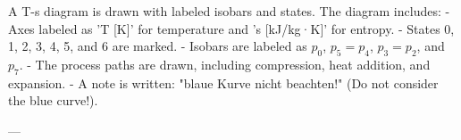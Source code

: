 A T-s diagram is drawn with labeled isobars and states. The diagram includes:  
- Axes labeled as 'T [K]' for temperature and 's [kJ/kg·K]' for entropy.  
- States 0, 1, 2, 3, 4, 5, and 6 are marked.  
- Isobars are labeled as \( p_0 \), \( p_5 = p_4 \), \( p_3 = p_2 \), and \( p_7 \).  
- The process paths are drawn, including compression, heat addition, and expansion.  
- A note is written: "blaue Kurve nicht beachten!" (Do not consider the blue curve!).  

---